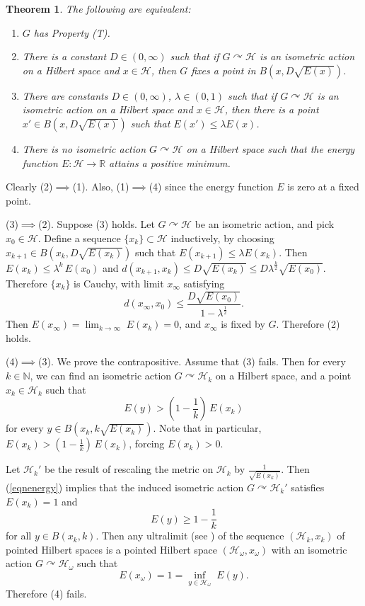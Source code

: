 \documentclass[12pt]{amsart}
\numberwithin{equation}{section}
\theoremstyle{plain}
\newtheorem{theorem}[equation]{Theorem}
\theoremstyle{remark}
\theoremstyle{definition}
\newcommand{\ra}{\rightarrow}
\newcommand{\h}{{\mathcal H}}
\newcommand{\N}{\mathbb N}
\newcommand{\R}{\mathbb R}
\newcommand{\acts}{\curvearrowright}
\def\la{\lambda}
\def\om{\omega}
\def\ra{\rightarrow}
\begin{document}
\begin{theorem}
\label{thma1}
The following are equivalent:
\begin{enumerate}
\item $G$ has Property (T).
\item There is a constant $D\in (0,\infty)$ such that
if $G\acts\h$ is an isometric action on a Hilbert space
and $x\in \h$, then $G$ fixes a point in $B(x,D\sqrt{E(x)})$.
\item There are constants $D\in (0,\infty)$, $\la\in (0,1)$
such that if $G\acts \h$ is an isometric action on 
a Hilbert space and $x\in \h$, then there is a point
$x'\in B(x,D\sqrt{E(x)})$ such that $E(x')\leq \la E(x)$.
\item There is no isometric action $G\acts \h$ on a Hilbert
space such that the energy function $E:\h\ra\R$ attains a
positive minimum.
\end{enumerate}
\end{theorem}
\proof
Clearly (2)$\implies$(1).  Also,  (1)$\implies$(4) since
the energy function $E$ is zero at a fixed point.

\bigskip
(3)$\implies$(2).  Suppose (3) holds.  Let $G\acts \h$
be an isometric action, and pick $x_0\in \h$.  Define a 
sequence $\{x_k\}\subset \h$ inductively, by choosing
$x_{k+1}\in B(x_k,D\sqrt{E(x_k)})$ such that 
$E(x_{k+1})\leq \la E(x_k)$.  Then $E(x_k)\leq \la^k\,E(x_0)$
and $d(x_{k+1},x_k)\leq D\sqrt{E(x_k)}
\leq D\la^{\frac{k}{2}}\sqrt{E(x_0)}$.  Therefore
$\{x_k\}$ is Cauchy, with limit $x_\infty$ satisfying
 $$
d(x_\infty,x_0)\leq \frac{D\sqrt{E(x_0)}}{1-\la^{\frac12}}.
$$
Then $E(x_\infty)=\lim_{k\ra\infty}\;E(x_k)=0$, and
$x_\infty$ is fixed by $G$.  Therefore (2) holds.

\bigskip
(4)$\implies$(3).  We prove the contrapositive.  
Assume that (3) fails.  Then for every $k\in \N$,
we can find an isometric action $G\acts \h_k$ on 
a Hilbert space, and a point $x_k\in \h_k$ such that
\begin{equation}
\label{eqnenergy}
E(y)>\left(1-\frac{1}{k}\right)\,E(x_k)
\end{equation}
for every $y\in B(x_k,k\sqrt{E(x_k)})$.  Note that in 
particular, $E(x_k)>\left(1-\frac{1}{k}\right)\,E(x_k)$,
forcing $E(x_k)>0$.

Let $\h_k'$ be the result of rescaling the metric on $\h_k$
by $\frac{1}{\sqrt{E(x_k)}}$.   Then (\ref{eqnenergy})
implies that the induced isometric
action $G\acts\h_k'$ satisfies $E(x_k)=1$ and 
\begin{equation}
E(y)\geq 1-\frac{1}{k}
\end{equation}
for all $y\in B(x_k,k)$.  Then any ultralimit (see 
\cite{asyinv,kleinerleeb})
of the 
sequence $(\h_k,x_k)$ of pointed Hilbert spaces is
a pointed Hilbert space $(\h_\om,x_\om)$ with an 
isometric action $G\acts \h_\om$ such that 
$$
E(x_\om)=1=\inf_{y\in \h_\om}\;E(y).
$$
Therefore (4) fails.
\end{document}

